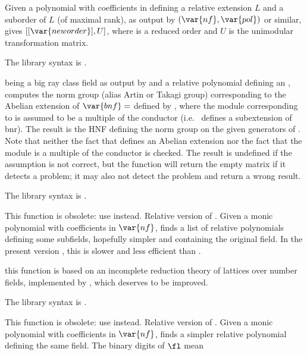 \label{se:rnflllgram}
Given a polynomial
 with coefficients in  defining a relative extension $L$ and
a suborder  of $L$ (of maximal rank), as output by
$(\var{nf},\var{pol})$ or similar, gives
$[[\var{neworder}],U]$, where  is a reduced order and $U$ is
the unimodular transformation matrix.

The library syntax is .

\label{se:rnfnormgroup}
 being a big ray
class field as output by  and  a relative polynomial
defining an , computes the norm group (alias Artin
or Takagi group) corresponding to the Abelian extension of
$\var{bnf}=$
defined by , where the module corresponding to  is assumed
to be a multiple of the conductor (i.e.~ defines a subextension of
bnr). The result is the HNF defining the norm group on the given generators
of . Note that neither the fact that  defines an
Abelian extension nor the fact that the module is a multiple of the conductor
is checked. The result is undefined if the assumption is not correct,
but the function will return the empty matrix \kbd{[;]} if it detects a
problem; it may also not detect the problem and return a wrong result.

The library syntax is .

\label{se:rnfpolred}
This function is obsolete: use  instead.
Relative version of . Given a monic polynomial  with
coefficients in $\var{nf}$, finds a list of relative polynomials defining some
subfields, hopefully simpler and containing the original field. In the present
version \vers, this is slower and less efficient than .

 this function is based on an incomplete reduction
theory of lattices over number fields, implemented by , which
deserves to be improved.

The library syntax is .

\label{se:rnfpolredabs}
This function is obsolete: use  instead.
Relative version of . Given a monic polynomial 
with coefficients in $\var{nf}$, finds a simpler relative polynomial defining
the same field. The binary digits of $\fl$ mean

